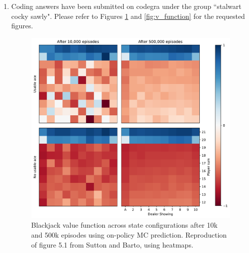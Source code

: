 \documentclass{article}
\begin{document}
\begin{enumerate}
	\item Coding answers have been submitted on codegra under the group ``stalwart cocky sawly".
	      Please refer to Figures \ref{fig:figure_5.1} and \ref{fig:v_function} for the requested figures.
	      \begin{figure}[ht]
		      \centering
		      \includegraphics[width=\textwidth]{fig_5.1}
		      \caption{Blackjack value function across state configurations after 10k and 500k episodes
			      using on-policy MC prediction. Reproduction of figure 5.1 from Sutton and Barto, using
			      heatmaps.}
		      \label{fig:figure_5.1}
	      \end{figure}


\end{enumerate}
\end{document}

